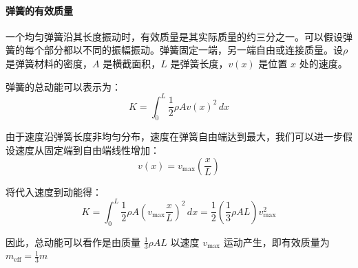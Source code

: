 \documentclass[a4paper,zihao=5,UTF8,fontset=fandol]{../phyreport}
\begin{document}
\paragraph{弹簧的有效质量}
一个均匀弹簧沿其长度振动时，有效质量是其实际质量的约三分之一。可以假设弹簧的每个部分都以不同的振幅振动。弹簧固定一端，另一端自由或连接质量。设\( \rho \) 是弹簧材料的密度，\( A \) 是横截面积，\( L \) 是弹簧长度，\( v(x) \) 是位置 \( x \) 处的速度。

弹簧的总动能可以表示为：
\begin{equation}
	K = \int_0^L \frac{1}{2} \rho A v(x)^2 \, dx
\end{equation}

由于速度沿弹簧长度非均匀分布，速度在弹簧自由端达到最大，我们可以进一步假设速度从固定端到自由端线性增加：
\begin{equation}
	v(x) = v_{\text{max}} \left(\frac{x}{L}\right)
\end{equation}

将代入速度到动能得：
\begin{equation}
		K = \int_0^L \frac{1}{2} \rho A \left(v_{\text{max}} \frac{x}{L}\right)^2 \, dx   = \frac{1}{2}\left( \frac{1}{3} \rho A L \right) v_{\text{max}}^2
\end{equation}

因此，总动能可以看作是由质量 \( \frac{1}{3} \rho A L \) 以速度 \( v_{\text{max}} \) 运动产生，即有效质量为 $m_{\text{eff}} = \frac{1}{3} m$
\end{document}
